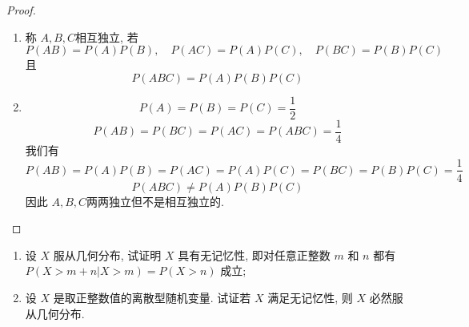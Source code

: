 \documentclass[../main.tex]{subfiles}
\begin{document}
\begin{proof}
    \begin{enumerate}
        \item 称 \(  A,B,C  \)相互独立, 若 \[
        P\left( AB \right)= P\left( A \right)P\left( B \right) ,\quad P\left( AC \right)= P\left( A \right)P\left( C \right),\quad P\left( BC \right)= P\left( B \right)P\left( C \right)         
        \]且 \[
        P\left( ABC \right)= P\left( A \right)P\left( B \right)P\left( C \right)    
        \] 
        \item  \[
        P\left( A \right)= P\left( B \right)= P\left( C \right)= \frac{1 }{2 }    
        \] \[
        P\left( AB \right)= P\left( BC \right)= P\left( AC \right)= P\left( ABC \right)= \frac{1 }{4 }     
        \]我们有\[
        P\left( AB \right)= P\left( A \right)P\left( B \right) = P\left( AC \right)= P\left( A \right)P\left( C \right)=  P\left( BC \right)= P\left( B \right)P\left( C \right)   =       \frac{1 }{4 } 
        \] \[
        P\left( ABC \right)\neq P\left( A \right)P\left( B \right)P\left( C \right)    
        \]因此 \(  A,B,C  \)两两独立但不是相互独立的. 
    \end{enumerate}
    
\end{proof}
\begin{exercise}{}{}
\begin{enumerate}
    \item 设 $X$ 服从几何分布, 试证明 $X$ 具有无记忆性, 即对任意正整数 $m$ 和 $n$ 都有 $P(X > m+n | X > m) = P(X > n)$ 成立;
    \item 设 $X$ 是取正整数值的离散型随机变量. 试证若 $X$ 满足无记忆性, 则 $X$ 必然服从几何分布.
\end{enumerate}
\end{exercise}
\end{document}
